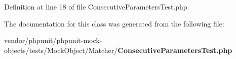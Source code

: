 Definition at line 18 of file Consecutive\+Parameters\+Test.\+php.



The documentation for this class was generated from the following file\+:\begin{DoxyCompactItemize}
\item 
vendor/phpunit/phpunit-\/mock-\/objects/tests/\+Mock\+Object/\+Matcher/{\bf Consecutive\+Parameters\+Test.\+php}\end{DoxyCompactItemize}
